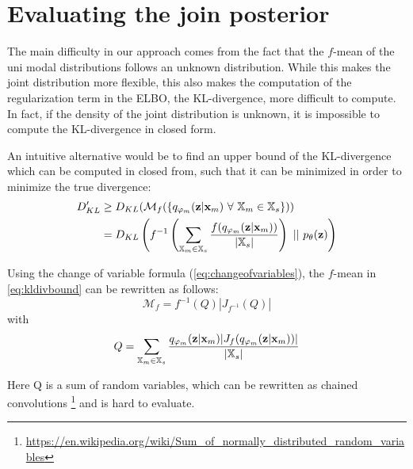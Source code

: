 
\section{Evaluating the join posterior}
The main difficulty in our approach comes from the fact that the $f$-mean of the uni modal distributions follows an unknown distribution.
While this makes the joint distribution more flexible, this also makes the computation of the regularization term in the ELBO, the KL-divergence, more difficult to compute.
In fact, if the density of the joint distribution is unknown, it is impossible to compute the KL-divergence in closed form.

An intuitive alternative would be to find an upper bound of the KL-divergence which can be computed in closed from, such that it can be minimized in order to minimize the true divergence:
\begin{equation}
    \label{eq:kldivbound}
    \begin{split}
    D_{KL}^{\prime} &\geq D_{KL}(\mathcal{M}_f(\{\unimodalpost\ \forall\ \xsetm \in \xsubset\}))\\
    &=  D_{KL}\left(f^{-1}\left(\sum _{\xsetm \in \xsubset} \frac{f(\unimodalpost)}{|\xsubset|}\right)\ ||\ \prior\right)
    \end{split}
\end{equation}

Using the change of variable formula (\cref{eq:changeofvariables}), the $f$-mean in \cref{eq:kldivbound} can be rewritten as follows:
\begin{equation}
    \mathcal{M}_f = f^{-1}(Q)|J_{f^{-1}}(Q)|
\end{equation}
with
\begin{equation}
    Q= \sum _{\mathbb{X}_m \in \mathbb{X}_s} \frac{q_{\varphi_m}(\textbf{z}|\textbf{x}_m)|J_f(q_{\varphi_m}(\textbf{z}|\textbf{x}_m))|}{|\mathbb{X}_s|}
\end{equation}

Here Q is a sum of random variables, which can be rewritten as chained convolutions \footnote{\url{https://en.wikipedia.org/wiki/Sum_of_normally_distributed_random_variables}} and is hard to evaluate.

